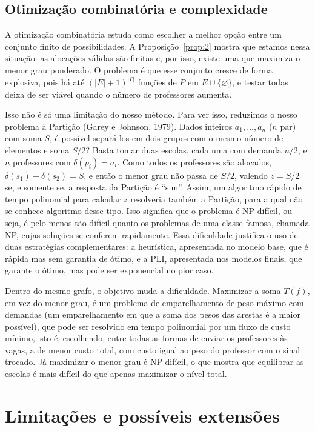 \documentclass[12pt,a4paper]{article}
\begin{document}
\subsection{Otimização combinatória e complexidade}

A otimização combinatória estuda como escolher a melhor opção entre um conjunto finito de possibilidades. A Proposição~\ref{prop:2} mostra que estamos nessa situação: as alocações válidas são finitas e, por isso, existe uma que maximiza o menor grau ponderado. O problema é que esse conjunto cresce de forma explosiva, pois há até $(|E| + 1)^{|P|}$ funções de $P$ em $E \cup \{\varnothing\}$, e testar todas deixa de ser viável quando o número de professores aumenta.

Isso não é só uma limitação do nosso método. Para ver isso, reduzimos o nosso problema à Partição (Garey e Johnson, 1979). Dados inteiros $a_1, \dots, a_n$ ($n$ par) com soma $S$, é possível separá-los em dois grupos com o mesmo número de elementos e soma $S/2$? Basta tomar duas escolas, cada uma com demanda $n/2$, e $n$ professores com $\delta(p_i) = a_i$. Como todos os professores são alocados, $\delta(s_1) + \delta(s_2) = S$, e então o menor grau não passa de $S/2$, valendo $z = S/2$ se, e somente se, a resposta da Partição é ``sim''. Assim, um algoritmo rápido de tempo polinomial para calcular $z$ resolveria também a Partição, para a qual não se conhece algoritmo desse tipo. Isso significa que o problema é NP-difícil, ou seja, é pelo menos tão difícil quanto os problemas de uma classe famosa, chamada NP, cujas soluções se conferem rapidamente. Essa dificuldade justifica o uso de duas estratégias complementares: a heurística, apresentada no modelo base, que é rápida mas sem garantia de ótimo, e a PLI, apresentada nos modelos finais, que garante o ótimo, mas pode ser exponencial no pior caso.

Dentro do mesmo grafo, o objetivo muda a dificuldade. Maximizar a soma $T(f)$, em vez do menor grau, é um problema de emparelhamento de peso máximo com demandas (um emparelhamento em que a soma dos pesos das arestas é a maior possível), que pode ser resolvido em tempo polinomial por um fluxo de custo mínimo, isto é, escolhendo, entre todas as formas de enviar os professores às vagas, a de menor custo total, com custo igual ao peso do professor com o sinal trocado. Já maximizar o menor grau é NP-difícil, o que mostra que equilibrar as escolas é mais difícil do que apenas maximizar o nível total.


\section{Limitações e possíveis extensões}
\end{document}
